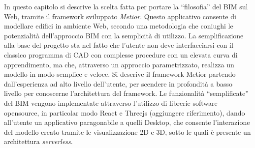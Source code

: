 In questo capitolo si descrive la scelta fatta per portare la ``filosofia'' del BIM sul Web, tramite il framework sviluppato
\emph{Metior}.
Questo applicativo consente di modellare edifici in ambiente Web, secondo una metodologia che coniughi le potenzialità
dell’approccio BIM con la semplicità di utilizzo.
La semplificazione alla base del progetto sta nel fatto che l'utente non deve interfacciarsi con il classico programma
di CAD con complesse procedure con un elevata curva di apprendimento, ma che, attraverso un approccio parametrizzato,
realizza un modello in modo semplice e veloce.
Si descrive il framework Metior partendo dall'esperienza ad alto livello dell'utente, per scendere in profondità
a basso livello per conoscerne l'architettura del framework.
Le funzionalità ``semplificate'' del BIM vengono implementate attraverso l'utilizzo di librerie software opensource,
in particolar modo React e Threejs (aggiungere riferimento), dando all'utente un applicativo paragonabile a quelli
Desktop, che consente l'interazione del modello creato tramite le visualizzazione 2D e 3D, sotto le quali
è presente un architettura \emph{serverless}.
\newpage
